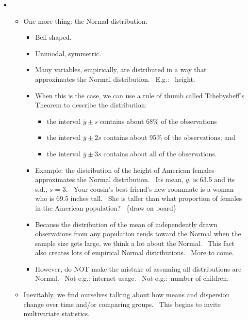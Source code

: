 \documentclass[11pt]{article}
\begin{document}
\begin{itemize}
\item 
\begin{itemize}
\item One more thing: the Normal distribution. \ 

\begin{itemize}
\item Bell shaped.

\item Unimodal, symmetric.

\item Many variables, empirically, are distributed in a way that
approximates the Normal distribution. \ E.g.: \ height. \ 

\item When this is the case, we can use a rule of thumb called Tchebysheff's
Theorem to describe the distribution:

\begin{itemize}
\item the interval $\overline{y}\pm s$ contains about 68\% of the
observations

\item the interval $\overline{y}\pm 2s$ contains about 95\% of the
observations; and

\item the interval $\overline{y}\pm 3s$ contains about all of the
observations.
\end{itemize}

\item Example: the distribution of the height of American females
approximates the Normal distribution. \ Its mean, $\overline{y}$, is 63.5
and its s.d., $s$ = 3. \ Your cousin's best friend's new roommate is a woman
who is 69.5 inches tall. \ She is taller than what proportion of females in
the American population? \ \{draw on board\}

\item Because the distribution of the mean of independently drawn
observations from any population tends toward the Normal when the sample
size gets large, we think a lot about the Normal. \ This fact also creates
lots of empirical Normal distributions. \ More to come.

\item However, do NOT make the mistake of assuming all distributions are
Normal. \ Not e.g.: internet usage. \ Not e.g.:\ number of children.
\end{itemize}

\item Inevitably, we find ourselves talking about how means and dispersion
change over time and/or comparing groups. \ This begins to invite
multivariate statistics.


\end{itemize}
\end{itemize}
\end{document}
